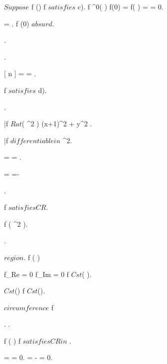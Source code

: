 \documentclass[../Main/main]{subfiles}
\begin{document}
{{{			
			{
				$ Suppose $ \exists \; f \in \Hc(\D) \suchthat f $ satisfies $ c).
				f \in \Cc^0( \D ) \imp f(0) = f(  ) =  = 0.

				 =  \nin \C.
				f \nin \Hc(0) $ absurd $.
			}.

			{
				.

				{
					 =  = 
				}.

				f $ satisfies $ d).


				.

				\bar{f} \in $ Rat$( \R^2 ) \logicAnd {}
				{
					(x+1)^2 + y^2 
				}.

				\bar{f} $ differentiable in $ \R^2.

				{
					 =  = .

					 = =-
				}.				

				f $ satisfies CR $.

				\conclude f \in \Hc( \R^2 ).

			}.
		}
	}


	{
		{
			\Omega \subset \C $ region $.
			f \in \Hc( \Omega )
		}
		\holds
		{
			f_{Re} = 0 \logicOr f_{Im} = 0 \imp f \in $ Cst$( \Omega ).

			 \in $ Cst$(\Omega) \imp f \in $ Cst$(\Omega).

			 $ circumference $ \imp f \in \constant{ \Omega }

		}
		\demonstration
		{
			{
				.
				.

				f \in \Hc( \Omega ) \imp f $ satisfies CR in $ \Omega.

				 =   = 0.
				 = - = 0.

}}}}
\end{document}
